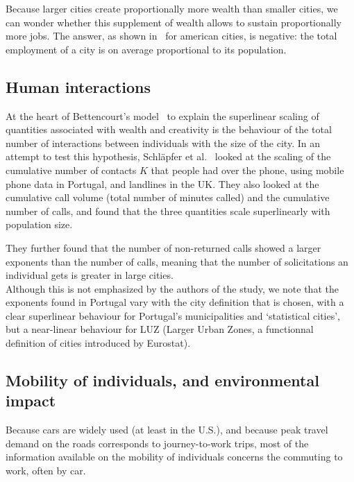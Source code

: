 Because larger cities create proportionally more wealth than smaller cities, we
can wonder whether this supplement of wealth allows to sustain proportionally
more jobs. The answer, as shown in~\cite{Bettencourt:2014} for american cities,
is negative: the total employment of a city is on average proportional to its population.

\subsection{Human interactions}
\label{sub:human_interactions}

At the heart of Bettencourt's model~\cite{Bettencourt:2013} to explain the
superlinear scaling of quantities associated with wealth and creativity is the
behaviour of the total number of interactions between individuals with the size
of the city. In an attempt to test this hypothesis, Schl\"apfer et
al.~\cite{Schlapfer:2014} looked at the scaling of the cumulative number of
contacts $K$ that people had over the phone, using mobile phone data in
Portugal, and landlines in the UK. They also looked at the cumulative call
volume (total number of minutes called) and the cumulative number of calls, and
found that the three quantities scale superlinearly with population size. 

They further found that the number of non-returned calls showed a larger
exponents than the number of calls, meaning that the number of solicitations an
individual gets is greater in large cities.\\

Although this is not emphasized by the authors of the study, we note that the
exponents found in Portugal vary with the city definition that is chosen, with a
clear superlinear behaviour for Portugal's municipalities and `statistical
cities', but a near-linear behaviour for LUZ (Larger Urban Zones, a functionnal
definition of cities introduced by Eurostat).


\subsection{Mobility of individuals, and environmental impact}
\label{sub:mobility}

Because cars are widely used (at least in the U.S.), and because peak travel
demand on the roads corresponds to journey-to-work trips, most of the
information available on the mobility of individuals concerns the commuting to
work, often by car. 

